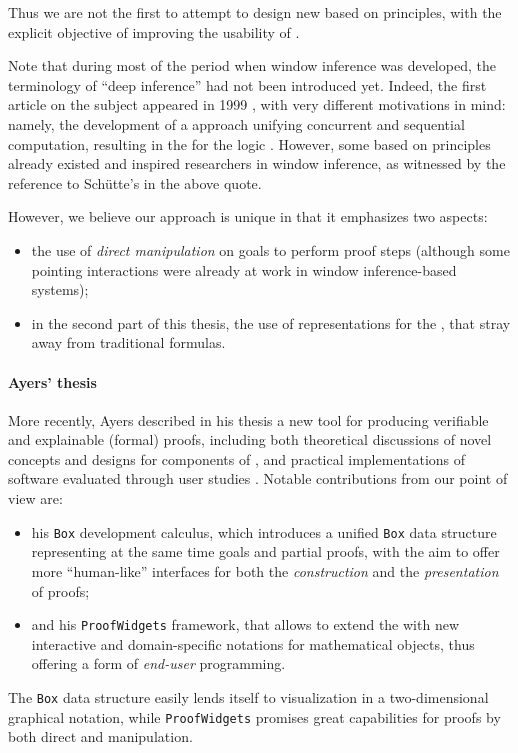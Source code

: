 Thus we are not the first to attempt to design new  based on  principles, with the explicit objective of improving the usability of
.
\begin{digression}
  Note that during most of the period when window inference was developed, the
terminology of ``deep inference'' had not been introduced yet. Indeed, the first
article on the subject appeared in 1999 \cite{Guglielmi1999ACO}, with very
different motivations in mind: namely, the development of a 
approach unifying concurrent and sequential computation, resulting in the
 for the logic . However, some  based
on  principles already existed and inspired researchers in window
inference, as witnessed by the reference to Schütte's  in the above
quote.
\end{digression}
However, we believe our approach is unique in that it emphasizes two aspects:
\begin{itemize}
  \item the use of \emph{direct manipulation} on goals to perform proof steps
  (although some pointing interactions were already at work in window
  inference-based systems);
  \item in the second part of this thesis, the use of \emph{}
  representations for the , that stray away from traditional 
  formulas.
\end{itemize}

\paragraph{Ayers' thesis}

More recently, Ayers described in his thesis a new tool for producing verifiable
and explainable (formal) proofs, including both theoretical discussions of novel
concepts and designs for components of , and practical
implementations of software evaluated through user studies
. Notable contributions from our point of view are:
\begin{itemize}
  \item his \texttt{Box} development calculus, which introduces a unified
\texttt{Box} data structure representing at the same time goals and partial
proofs, with the aim to offer more ``human-like'' interfaces for both the
\emph{construction} and the \emph{presentation} of proofs;
  \item and his \texttt{ProofWidgets} framework, that allows to extend the
  with new interactive and domain-specific
notations for mathematical objects, thus offering a form of \emph{end-user}
programming.
\end{itemize}
The \texttt{Box} data structure easily lends itself to visualization in a
two-dimensional graphical notation, while \texttt{ProofWidgets} promises great
capabilities for proofs by both direct and  manipulation.

